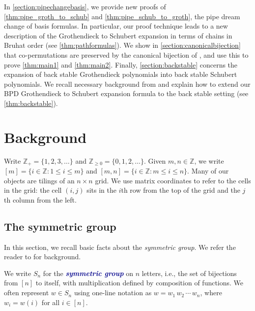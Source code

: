 \documentclass[12 pt]{amsart}
\newcommand{\newword}[1]{\textcolor{darkblue}{\textbf{\emph{#1}}}}
\numberwithin{equation}{section}
\theoremstyle{remark}
\begin{document}
	In \cref{section:pipechangebasis}, we provide new proofs of \cref{thm:pipe_groth_to_schub} and \cref{thm:pipe_schub_to_groth}, the pipe dream change of basis formulas. 
	In particular, our proof technique leads to a new description of the Grothendieck to Schubert expansion in terms of chains in Bruhat order (see \cref{thm:pathformulas}). 
	We show in \cref{section:canonicalbijection} that co-permutations are preserved by the canonical bijection of \cite{Gao.Huang}, and use this to prove \cref{thm:main1} and \cref{thm:main2}.
	Finally, \cref{section:backstable} concerns the expansion of back stable Grothendieck polynomials into back stable Schubert polynomials. 
	We recall necessary background from \cite{Lam.Lee.Shimozono,Lam.Lee.Shimozono-K-theory} and explain how to extend our BPD Grothendieck to Schubert expansion formula to the back stable setting (see \cref{thm:backstable}).
	
	

	\section{Background}
	\label{section:background}
	
	Write $\mathbb{Z}_{+} = \{1,2,3,\ldots\}$ and $\mathbb{Z}_{\geq 0} = \{0,1,2,\ldots\}$. Given $m,n \in \mathbb{Z}$, we write $[m] = \{i \in \mathbb{Z} : 1\leq i\leq m\}$ and $[m,n] = \{i \in \mathbb{Z} : m\leq i\leq n\}$. 
	Many of our objects are tilings of an $n \times n$ grid. 
	We use matrix coordinates to refer to the cells in the grid: the cell $(i,j)$ sits in the $i$th row from the top of the grid and the $j$th column from the left.
	
	\subsection{The symmetric group}
	
	In this section, we recall basic facts about the \emph{symmetric group}. 
	We refer the reader to \cite{Manivel} for background.
	

	
	We write $S_n$ for the \newword{symmetric group} on $n$ letters, i.e., the set of bijections from $[n]$ to itself, with multiplication defined by composition of functions. 
	We often represent $w \in S_n$ using one-line notation as $w = w_1\,w_2\,\cdots \, w_n$, where $w_i = w(i)$ for all $i \in [n]$. 
	
\end{document}
